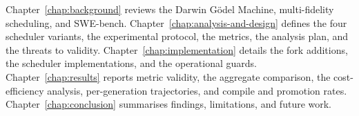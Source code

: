 Chapter~\ref{chap:background} reviews the Darwin G{\"o}del Machine,
multi-fidelity scheduling, and SWE-bench.
Chapter~\ref{chap:analysis-and-design} defines the four scheduler
variants, the experimental protocol, the metrics, the analysis plan, and
the threats to validity. Chapter~\ref{chap:implementation} details the
fork additions, the scheduler implementations, and the operational
guards. Chapter~\ref{chap:results} reports metric validity, the
aggregate comparison, the cost-efficiency analysis, per-generation
trajectories, and compile and promotion rates.
Chapter~\ref{chap:conclusion} summarises findings, limitations, and
future work.
